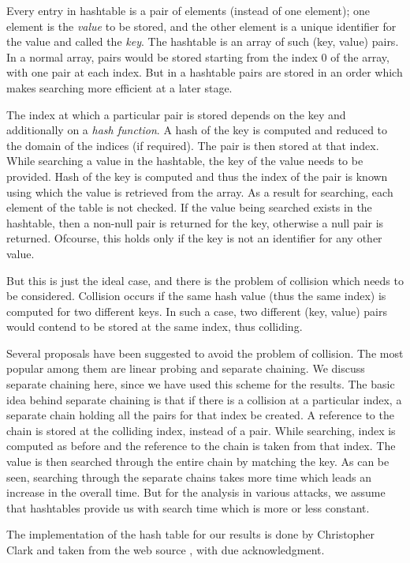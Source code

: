 Every entry in hashtable is a pair of elements (instead of one element); one element is the \emph{value} to be stored, and the other element is a unique identifier for the value and called the \emph{key}. The hashtable is an array of such (key, value) pairs. In a normal array, pairs would be stored starting from the index 0 of the array, with one pair at each index. But in a hashtable pairs are stored in an order which makes searching more efficient at a later stage. 

The index at which a particular pair is stored depends on the key and additionally on a \textit{hash function}. A hash of the key is computed and reduced to the domain of the indices (if required). The pair is then stored at that index. While searching a value in the hashtable, the key of the value needs to be provided. Hash of the key is computed and thus the index of the pair is known using which the value is retrieved from the array. As a result for searching, each element of the table is not checked. If the value being searched exists in the hashtable, then a non-null pair is returned for the key, otherwise a null pair is returned. Ofcourse, this holds only if the key is not an identifier for any other value.

But this is just the ideal case, and there is the problem of collision which needs to be considered. Collision occurs if the same hash value (thus the same index) is computed for two different keys. In such a case, two different (key, value) pairs would contend to be stored at the same index, thus colliding. 

Several proposals have been suggested to avoid the problem of collision. The most popular among them are linear probing and separate chaining. We discuss separate chaining here, since we have used this scheme for the results. The basic idea behind separate chaining is that if there is a collision at a particular index, a separate chain holding all the pairs for that index be created. A reference to the chain is stored at the colliding index, instead of a pair. While searching, index is computed as before and the reference to the chain is taken from that index. The value is then searched through the entire chain by matching the key. As can be seen, searching through the separate chains takes more time which leads an increase in the overall time. But for the analysis in various attacks, we assume that hashtables provide us with search time which is more or less constant. 

The implementation of the hash table for our results is done by Christopher Clark and taken from the web source \cite{hash-table-impl}, with due acknowledgment. 


